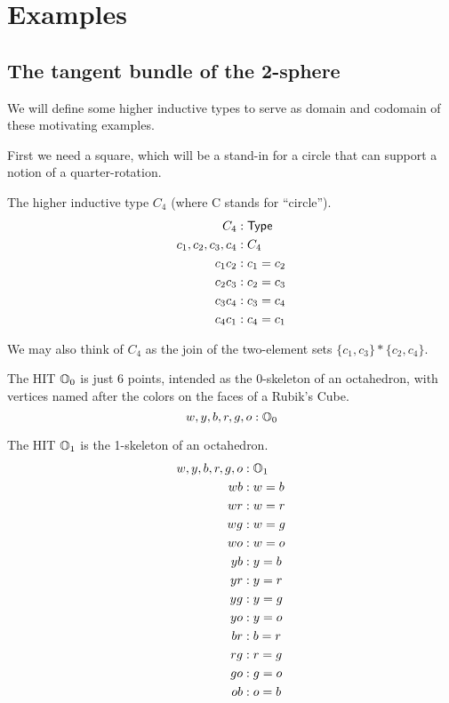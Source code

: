 \section{Examples}
\subsection{The tangent bundle of the 2-sphere}

We will define some higher inductive types to serve as domain and codomain of these motivating examples.

First we need a square, which will be a stand-in for a circle that can support a notion of a quarter-rotation. 

\begin{mydef}
The higher inductive type \( C_4 \) (where C stands for ``circle'').
\begin{align*}
C_4 &: \mathsf{Type} \\
c_1, c_2, c_3, c_4 &: C_4 \\
c_1c_2 &: c_1 = c_2 \\
c_2c_3 &: c_2 = c_3 \\
c_3c_4 &: c_3 = c_4 \\
c_4c_1 &: c_4 = c_1 \\
\end{align*}
\end{mydef}



We may also think of \( C_4 \) as the join of the two-element sets \( \{c_1, c_3\}* \{c_2, c_4\} \).

\begin{mydef}
The HIT \( \mathbb{O}_0 \) is just 6 points, intended as the 0-skeleton of an octahedron, with vertices named after the colors on the faces of a Rubik's Cube.
\[ w, y, b, r, g, o : \mathbb{O}_0 \]
\end{mydef}

\begin{mydef}
The HIT \( \mathbb{O}_1 \) is the 1-skeleton of an octahedron.
\begin{align*}
w, y, b, r, g, o &: \mathbb{O}_1 \\
wb &: w=b \\
wr &: w=r \\
wg &: w=g \\
wo &: w=o \\
yb &: y=b \\
yr &: y=r \\
yg &: y=g \\
yo &: y=o \\
br &: b=r \\
rg &: r=g \\
go &: g=o \\
ob &: o=b 
\end{align*}
\end{mydef}

